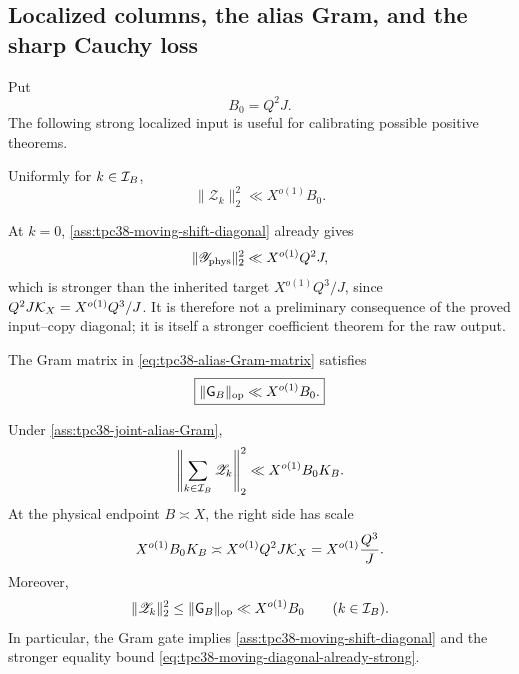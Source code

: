 \subsection{Localized columns, the alias Gram, and the sharp Cauchy loss}

Put
\begin{equation}
 B_0=Q^2J.
 \label{eq:tpc38-B0}
\end{equation}
The following strong localized input is useful for calibrating possible
positive theorems.

\begin{assumption}
\label{ass:tpc38-moving-shift-diagonal}
Uniformly for \(k\in\mathcal I_B\),
\begin{equation}
 \|\mathscr Z_k\|_2^2\ll X^{o(1)}B_0.
 \label{eq:tpc38-moving-shift-diagonal}
\end{equation}
\end{assumption}

At \(k=0\), \cref{ass:tpc38-moving-shift-diagonal} already gives
\begin{equation}
 \|\mathscr Y_{\rm phys}\|_2^2
 \ll X^{o(1)}Q^2J,
 \label{eq:tpc38-moving-diagonal-already-strong}
\end{equation}
which is stronger than the inherited target \(X^{o(1)}Q^3/J\), since
\(Q^2J\mathcal K_X=X^{o(1)}Q^3/J\).
It is therefore not a preliminary consequence of the proved input--copy
diagonal; it is itself a stronger coefficient theorem for the raw output.

\begin{assumption}
\label{ass:tpc38-joint-alias-Gram}
The Gram matrix in \eqref{eq:tpc38-alias-Gram-matrix} satisfies
\begin{equation}
 \boxed{\|\mathsf G_B\|_{\operatorname{op}}\ll X^{o(1)}B_0.}
 \label{eq:tpc38-joint-alias-Gram-gate}
\end{equation}
\end{assumption}

\begin{proposition}
\label{prop:tpc38-reduced-gate-suffices}
Under \cref{ass:tpc38-joint-alias-Gram},
\begin{equation}
 \left\|\sum_{k\in\mathcal I_B}\mathscr Z_k\right\|_2^2
 \ll X^{o(1)}B_0K_B.
 \label{eq:tpc38-reduced-gate-output}
\end{equation}
At the physical endpoint \(B\asymp X\), the right side has scale
\begin{equation}
 X^{o(1)}B_0K_B
 \asymp X^{o(1)}Q^2J\mathcal K_X
 =X^{o(1)}\frac{Q^3}{J}.
 \label{eq:tpc38-reduced-gate-endpoint}
\end{equation}
Moreover,
\begin{equation}
 \|\mathscr Z_k\|_2^2
 \le \|\mathsf G_B\|_{\operatorname{op}}
 \ll X^{o(1)}B_0
 \qquad(k\in\mathcal I_B).
 \label{eq:tpc38-Gram-implies-columns}
\end{equation}
In particular, the Gram gate implies
\cref{ass:tpc38-moving-shift-diagonal} and the stronger equality bound
\eqref{eq:tpc38-moving-diagonal-already-strong}.
\end{proposition}

